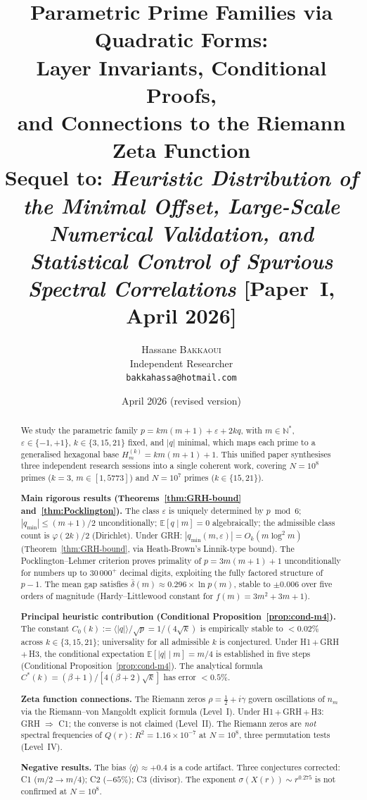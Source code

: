 \documentclass[11pt,a4paper]{article}
\title{Parametric Prime Families via Quadratic Forms:\\
{\large Layer Invariants, Conditional Proofs,\\
and Connections to the Riemann Zeta Function}\\[6pt]
{\normalsize Sequel to: \emph{Heuristic Distribution of the Minimal
Offset, Large-Scale Numerical Validation, and Statistical Control of
Spurious Spectral Correlations} [Paper~I, April 2026]}}
\author{Hassane \textsc{Bakkaoui}\\
\small Independent Researcher\\
\small \texttt{bakkahassa@hotmail.com}}
\date{April 2026 (revised version)}
\theoremstyle{definition}
\theoremstyle{remark}
\newcommand{\N}{\mathbb{N}}
\newcommand{\E}{\mathbb{E}}
\newcommand{\qmin}{q_{\min}}
\newcommand{\eps}{\varepsilon}
\begin{document}
\maketitle

\begin{abstract}
We study the parametric family $p=km(m+1)+\eps+2kq$, with
$m\in\N^{*}$, $\eps\in\{-1,+1\}$, $k\in\{3,15,21\}$ fixed, and $|q|$
minimal, which maps each prime to a generalised hexagonal base
$H_{m}^{(k)}=km(m+1)+1$. This unified paper synthesises three
independent research sessions into a single coherent work, covering
$N=10^{8}$ primes ($k=3$, $m\in[1,5773]$) and $N=10^{7}$ primes
($k\in\{15,21\}$).

\smallskip
\noindent\textbf{Main rigorous results
(Theorems~\ref{thm:GRH-bound} and~\ref{thm:Pocklington}).}
The class $\eps$ is uniquely determined by $p\bmod 6$;
$|\qmin|\le(m+1)/2$ unconditionally; $\E[q\mid m]=0$ algebraically;
the admissible class count is $\varphi(2k)/2$ (Dirichlet). Under
\textup{GRH}: $|\qmin(m,\eps)|=O_{k}(m\log^{2}m)$
(Theorem~\ref{thm:GRH-bound}, via Heath-Brown's Linnik-type bound).
The Pocklington--Lehmer criterion proves primality of
$p=3m(m+1)+1$ unconditionally for numbers up to $30\,000^{+}$
decimal digits, exploiting the fully factored structure of $p-1$.
The mean gap satisfies $\bar{\delta}(m)\approx 0.296\times\ln p(m)$,
stable to $\pm 0.006$ over five orders of magnitude (Hardy--Littlewood
constant for $f(m)=3m^{2}+3m+1$).

\smallskip
\noindent\textbf{Principal heuristic contribution (Conditional
Proposition~\ref{prop:cond-m4}).} The constant
$C_{0}(k):=\langle|q|\rangle/\sqrt{p}=1/(4\sqrt{k})$ is empirically
stable to $<0.02\%$ across $k\in\{3,15,21\}$; universality for all
admissible $k$ is conjectured. Under
\textup{H1}\,$+$\,\textup{GRH}\,$+$\,\textup{H3}, the conditional
expectation $\E[|q|\mid m]=m/4$ is established in five steps
(Conditional Proposition~\ref{prop:cond-m4}). The analytical formula
$C^{*}(k)=(\beta+1)/[4(\beta+2)\sqrt{k}]$ has error $<0.5\%$.

\smallskip
\noindent\textbf{Zeta function connections.} The Riemann zeros
$\rho=\tfrac{1}{2}+i\gamma$ govern oscillations of $n_{m}$ via the
Riemann--von Mangoldt explicit formula (Level~I). Under
\textup{H1}\,$+$\,\textup{GRH}\,$+$\,\textup{H3}: GRH $\Rightarrow$
C1; the converse is not claimed (Level~II). The Riemann zeros are
\emph{not} spectral frequencies of $Q(r)$:
$R^{2}=1.16\times 10^{-7}$ at $N=10^{8}$, three permutation tests
(Level~IV).

\smallskip
\noindent\textbf{Negative results.} The bias $\langle q\rangle\approx
+0.4$ is a code artifact. Three conjectures corrected: C1
($m/2\to m/4$); C2 ($-65\%$); C3 (divisor). The exponent
$\sigma(X(r))\sim r^{0.275}$ is not confirmed at $N=10^{8}$.
\end{abstract}
\end{document}

